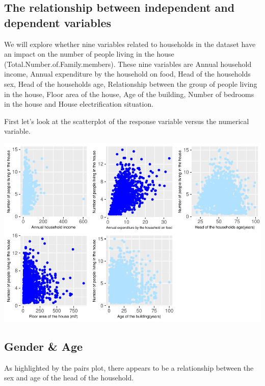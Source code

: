 \documentclass[
]{article}
\begin{document}
\hypertarget{the-relationship-between-independent-and-dependent-variables}{%
\subsection{The relationship between independent and dependent
variables}\label{the-relationship-between-independent-and-dependent-variables}}

We will explore whether nine variables related to households in the
dataset have an impact on the number of people living in the house
(Total.Number.of.Family.members). These nine variables are Annual
household income, Annual expenditure by the household on food, Head of
the households sex, Head of the households age, Relationship between the
group of people living in the house, Floor area of the house, Age of the
building, Number of bedrooms in the house and House electrification
situation.

First let's look at the scatterplot of the response variable versus the
numerical variable.

\begin{center}\includegraphics[width=1\linewidth]{Group_01_Project2_demo_files/figure-latex/unnamed-chunk-1-1} \end{center}

\hypertarget{gender-age}{%
\subsection{Gender \& Age}\label{gender-age}}

As highlighted by the pairs plot, there appears to be a relationship
between the sex and age of the head of the household.
\end{document}

